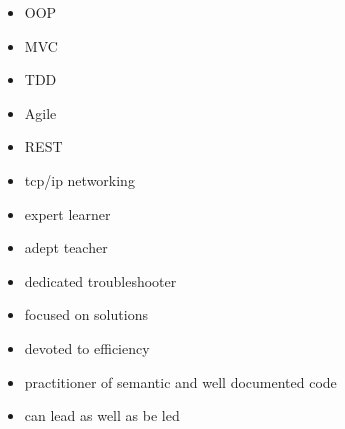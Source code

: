 \documentclass[letterpaper]{article}        %
\begin{document}
\begin{multicols}{3}
      \begin{itemize}
        \item OOP
        \item MVC
        \item TDD
        \item Agile
        \item REST
        \end{itemize}
    
      \begin{itemize}
            \end{itemize}
    
      \begin{itemize}
            \end{itemize}
    
      \begin{itemize}
        \item tcp/ip networking
        \end{itemize}
    
      \begin{itemize}
        \item expert learner
        \item adept teacher
        \item dedicated troubleshooter
        \item focused on solutions
        \item devoted to efficiency
        \item practitioner of semantic and well documented code
        \item can lead as well as be led
        \end{itemize}
    
    
  \end{multicols}
\end{document}
